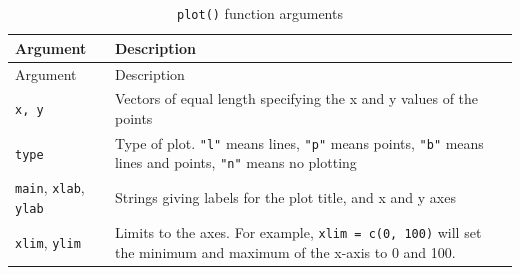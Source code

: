 \documentclass[]{book}
\theoremstyle{definition}
\theoremstyle{definition}
\theoremstyle{remark}
\begin{document}
\begin{longtable}[]{@{}ll@{}}
\caption{\label{tab:plot} \texttt{plot()} function arguments}\tabularnewline
\toprule
\begin{minipage}[b]{0.18\columnwidth}\raggedright\strut
Argument\strut
\end{minipage} & \begin{minipage}[b]{0.67\columnwidth}\raggedright\strut
Description\strut
\end{minipage}\tabularnewline
\midrule
\endfirsthead
\toprule
\begin{minipage}[b]{0.18\columnwidth}\raggedright\strut
Argument\strut
\end{minipage} & \begin{minipage}[b]{0.67\columnwidth}\raggedright\strut
Description\strut
\end{minipage}\tabularnewline
\midrule
\endhead
\begin{minipage}[t]{0.18\columnwidth}\raggedright\strut
\texttt{x,\ y}\strut
\end{minipage} & \begin{minipage}[t]{0.67\columnwidth}\raggedright\strut
Vectors of equal length specifying the x and y values of the
points\strut
\end{minipage}\tabularnewline
\begin{minipage}[t]{0.18\columnwidth}\raggedright\strut
\texttt{type}\strut
\end{minipage} & \begin{minipage}[t]{0.67\columnwidth}\raggedright\strut
Type of plot. \texttt{"l"} means lines, \texttt{"p"} means points,
\texttt{"b"} means lines and points, \texttt{"n"} means no
plotting\strut
\end{minipage}\tabularnewline
\begin{minipage}[t]{0.18\columnwidth}\raggedright\strut
\texttt{main}, \texttt{xlab}, \texttt{ylab}\strut
\end{minipage} & \begin{minipage}[t]{0.67\columnwidth}\raggedright\strut
Strings giving labels for the plot title, and x and y axes\strut
\end{minipage}\tabularnewline
\begin{minipage}[t]{0.18\columnwidth}\raggedright\strut
\texttt{xlim}, \texttt{ylim}\strut
\end{minipage} & \begin{minipage}[t]{0.67\columnwidth}\raggedright\strut
Limits to the axes. For example, \texttt{xlim\ =\ c(0,\ 100)} will set
the minimum and maximum of the x-axis to 0 and 100.\strut

\end{minipage}
\end{longtable}
\end{document}
